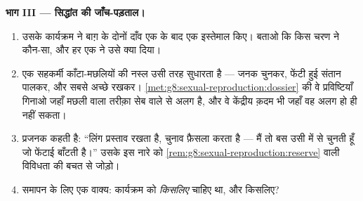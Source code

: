 \begin{problem}
\medskip\noindent\textbf{भाग III --- सिद्धांत की जाँच-पड़ताल।}
\begin{enumerate}[resume]
  \item उसके कार्यक्रम ने बाग़ के दोनों दाँव एक के बाद एक इस्तेमाल
        किए। बताओ कि किस चरण ने कौन-सा, और हर एक ने उसे क्या दिया।
  \item एक सहकर्मी काँटा-मछलियों की नस्ल उसी तरह सुधारता है ---
        जनक चुनकर, फेंटी हुई संतान पालकर, और सबसे अच्छे रखकर।
        \cref{met:g8:sexual-reproduction:dossier} की वे प्रविष्टियाँ
        गिनाओ जहाँ मछली वाला तरीक़ा सेब वाले से अलग है, और वे
        केंद्रीय क़दम भी जहाँ वह अलग हो ही नहीं सकता।
  \item प्रजनक कहती है: ``लिंग प्रस्ताव रखता है, चुनाव फ़ैसला करता है
        --- मैं तो बस उसी में से चुनती हूँ जो फेंटाई बाँटती है।''
        उसके इस नारे को \cref{rem:g8:sexual-reproduction:reserve}
        वाली विविधता की बचत से जोड़ो।
  \item समापन के लिए एक वाक्य: कार्यक्रम को  \emph{किसलिए}
        चाहिए था, और  किसलिए?
\end{enumerate}
\end{problem}

